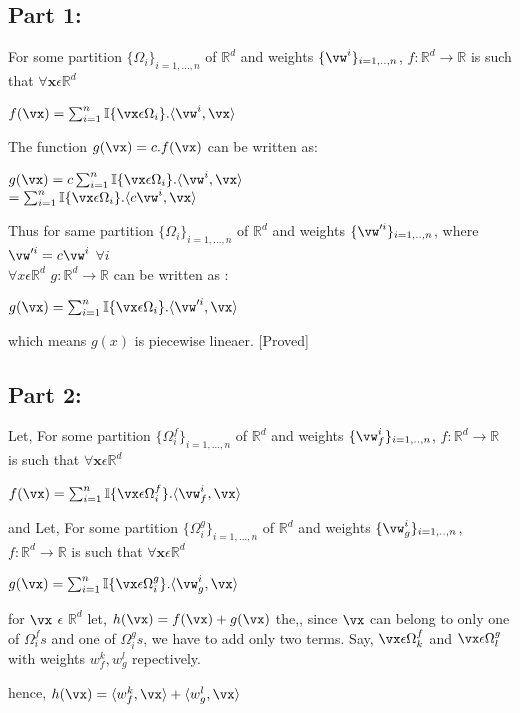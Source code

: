 \documentclass[a4paper,11pt]{article}
\begin{document}
\begin{mlsolution}
\subsection*{Part 1:}
For some partition $\{\Omega_i\}_{i=1,...,n}$ of $\mathbb{R}^d$ and weights $\{\vw^i\}_{i=1,..,n}$, $f:\mathbb{R}^d \rightarrow \mathbb{R}$ is such that $\forall \mathbf{x} \epsilon \mathbb{R}^d$
\begin{center}
$f(\vx) = \sum_{i=1}^{n}\mathbb{I}\{\vx \epsilon \Omega_i \}.\langle \vw^i,\vx\rangle$
\end{center}
The function $g(\vx) = c.f(\vx)$ can be written as:
\begin{center}
$g(\vx) = c\sum_{i=1}^{n}\mathbb{I}\{\vx \epsilon \Omega_i \}.\langle \vw^i,\vx\rangle$\\

$= \sum_{i=1}^{n}\mathbb{I}\{\vx \epsilon \Omega_i \}.\langle c\vw^i,\vx\rangle$
\end{center}
Thus for same partition $\{\Omega_i\}_{i=1,...,n}$ of $\mathbb{R}^d$ and weights $\{\vw'^i\}_{i=1,..,n}$, where $\vw'^i = c\vw^i$ $\forall i$\\
$\forall x\epsilon \mathbb{R}^d$ $g:\mathbb{R}^d \rightarrow \mathbb{R}$ can be written as :
\begin{center}
$g(\vx) = \sum_{i=1}^{n}\mathbb{I}\{\vx \epsilon \Omega_i \}.\langle \vw'^i,\vx\rangle$
\end{center}
which means $g(x)$ is piecewise lineaer. [Proved]

\subsection*{Part 2:}
Let, For some partition $\{\Omega_i^f\}_{i=1,...,n}$ of $\mathbb{R}^d$ and weights $\{\vw^i_f\}_{i=1,..,n}$, $f:\mathbb{R}^d \rightarrow \mathbb{R}$ is such that $\forall \mathbf{x} \epsilon \mathbb{R}^d$
\begin{center}
$f(\vx) = \sum_{i=1}^{n}\mathbb{I}\{\vx \epsilon \Omega_i^f \}.\langle \vw^i_f,\vx\rangle$
\end{center}
and Let, For some partition $\{\Omega_i^g\}_{i=1,...,n}$ of $\mathbb{R}^d$ and weights $\{\vw^i_g\}_{i=1,..,n}$, $f:\mathbb{R}^d \rightarrow \mathbb{R}$ is such that $\forall \mathbf{x} \epsilon \mathbb{R}^d$
\begin{center}
$g(\vx) = \sum_{i=1}^{n}\mathbb{I}\{\vx \epsilon \Omega_i^g \}.\langle \vw^i_g,\vx\rangle$
\end{center}
for $\vx$ $\epsilon$ $\mathbb{R}^d$ let, $h(\vx) = f(\vx) + g(\vx)$ the,, since $\vx$ can belong to only one of $\Omega_i^fs$ and one of $\Omega_i^gs$, we have to add only two terms. Say, $\vx \epsilon \Omega_k^f$ and $\vx \epsilon \Omega_l^g$ with weights $w^k_f,w^l_g $ repectively.
\begin{center}
hence, $h(\vx) = \langle w^k_f,\vx\rangle + \langle w^l_g,\vx\rangle $\\


\end{center}
\end{mlsolution}
\end{document}

